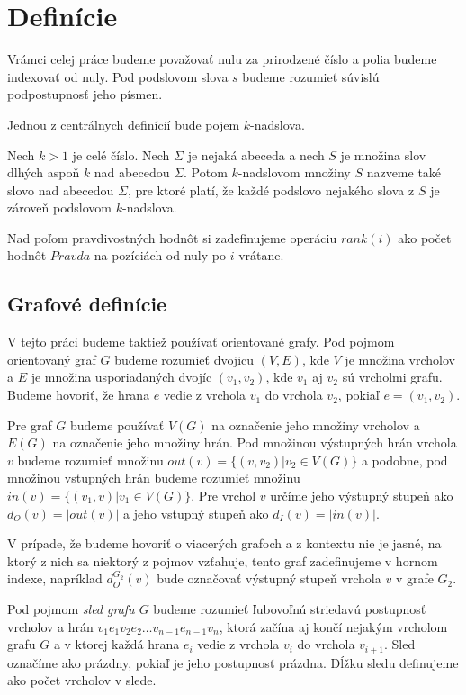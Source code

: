 \section{Definície}

Vrámci celej práce budeme považovať nulu za prirodzené číslo a polia budeme indexovať
od nuly. Pod podslovom slova $s$ budeme rozumieť súvislú podpostupnosť jeho písmen.

Jednou z centrálnych definícií bude pojem $k$-nadslova.

\begin{defn}
    Nech $k > 1$ je celé číslo. Nech $\Sigma$ je nejaká abeceda a nech $S$ je množina
    slov dlhých aspoň $k$ nad abecedou $\Sigma$. Potom $k$-nadslovom množiny $S$ nazveme také slovo
    nad abecedou $\Sigma$, pre ktoré platí, že každé podslovo nejakého slova z $S$ je
    zároveň podslovom $k$-nadslova.
\end{defn}

Nad poľom pravdivostných hodnôt si zadefinujeme operáciu $rank(i)$ ako počet hodnôt $Pravda$
na pozíciách od nuly po $i$ vrátane.

\subsection{Grafové definície}

V tejto práci budeme taktiež používať orientované grafy. Pod pojmom orientovaný graf $G$ budeme
rozumieť dvojicu $(V, E)$, kde $V$ je množina vrcholov a $E$ je množina usporiadaných
dvojíc $(v_1, v_2)$, kde $v_1$ aj $v_2$ sú vrcholmi grafu. Budeme hovoriť, že hrana $e$ vedie
z vrchola $v_1$ do vrchola $v_2$, pokiaľ $e = (v_1, v_2)$.

Pre graf $G$ budeme používať $V(G)$ na označenie jeho množiny vrcholov a $E(G)$ na označenie jeho
množiny hrán. Pod množinou výstupných hrán
vrchola $v$ budeme rozumieť množinu $out(v) = \{ (v, v_2) | v_2 \in V(G) \}$ a podobne,
pod množinou vstupných hrán budeme rozumieť množinu $in(v) = \{ (v_1, v) | v_1 \in V(G) \}$.
Pre vrchol $v$ určíme jeho výstupný stupeň ako $d_O(v) = |out(v)|$ a jeho vstupný stupeň ako $d_I(v) = |in(v)|$.

V prípade, že budeme hovoriť o viacerých grafoch a z kontextu nie je jasné, na ktorý z nich
sa niektorý z pojmov vzťahuje, tento graf zadefinujeme v hornom indexe, napríklad
$d_O^{G_2}(v)$ bude označovať výstupný stupeň vrchola $v$ v grafe $G_2$.

Pod pojmom \emph{sled grafu $G$} budeme rozumieť ľubovoľnú striedavú postupnosť vrcholov
a hrán $v_1 e_1 v_2 e_2 \ldots v_{n-1} e_{n-1} v_n$, ktorá začína aj končí nejakým vrcholom
grafu $G$ a v ktorej každá hrana $e_i$ vedie z vrchola $v_i$ do vrchola $v_{i+1}$. Sled označíme
ako prázdny, pokiaľ je jeho postupnosť prázdna. Dĺžku sledu definujeme ako počet vrcholov v slede.

